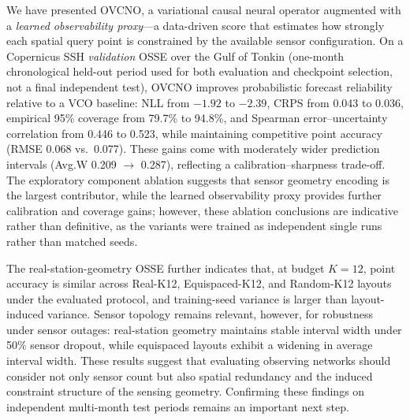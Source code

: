 \documentclass[11pt,a4paper]{article}
\begin{document}
We have presented OVCNO, a variational causal neural operator augmented with a \emph{learned observability proxy}---a data-driven score that estimates how strongly each spatial query point is constrained by the available sensor configuration. On a Copernicus SSH \emph{validation} OSSE over the Gulf of Tonkin (one-month chronological held-out period used for both evaluation and checkpoint selection, not a final independent test), OVCNO improves probabilistic forecast reliability relative to a VCO baseline: NLL from $-1.92$ to $-2.39$, CRPS from 0.043 to 0.036, empirical 95\% coverage from 79.7\% to 94.8\%, and Spearman error--uncertainty correlation from 0.446 to 0.523, while maintaining competitive point accuracy (RMSE 0.068 vs.\ 0.077). These gains come with moderately wider prediction intervals (Avg.W 0.209 $\to$ 0.287), reflecting a calibration--sharpness trade-off. The exploratory component ablation suggests that sensor geometry encoding is the largest contributor, while the learned observability proxy provides further calibration and coverage gains; however, these ablation conclusions are indicative rather than definitive, as the variants were trained as independent single runs rather than matched seeds.

The real-station-geometry OSSE further indicates that, at budget $K{=}12$, point accuracy is similar across Real-K12, Equispaced-K12, and Random-K12 layouts under the evaluated protocol, and training-seed variance is larger than layout-induced variance. Sensor topology remains relevant, however, for robustness under sensor outages: real-station geometry maintains stable interval width under 50\% sensor dropout, while equispaced layouts exhibit a widening in average interval width. These results suggest that evaluating observing networks should consider not only sensor count but also spatial redundancy and the induced constraint structure of the sensing geometry. Confirming these findings on independent multi-month test periods remains an important next step.
\end{document}

